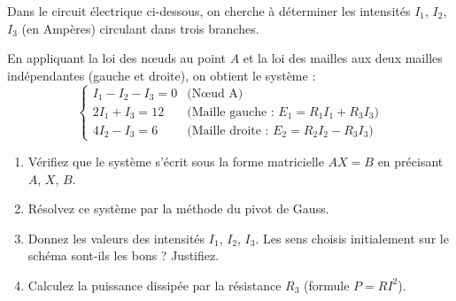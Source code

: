 \documentclass[11pt]{article}
\begin{document}
\begin{exercice}
\label{exo:electricite}
Dans le circuit électrique ci-dessous, on cherche à déterminer les intensités $I_1$, $I_2$, $I_3$ (en Ampères) circulant dans trois branches.
\begin{center}
\end{center}
En appliquant la loi des nœuds au point $A$ et la loi des mailles aux deux mailles indépendantes (gauche et droite), on obtient le système :
\[
\begin{cases}
I_1 - I_2 - I_3 = 0 & \text{(Nœud A)} \\
2I_1 + I_3 = 12 & \text{(Maille gauche : } E_1 = R_1 I_1 + R_3 I_3\text{)} \\
4I_2 - I_3 = 6 & \text{(Maille droite : } E_2 = R_2 I_2 - R_3 I_3\text{)}
\end{cases}
\]
\begin{enumerate}
\item Vérifiez que le système s'écrit sous la forme matricielle $A X = B$ en précisant $A$, $X$, $B$.
\item Résolvez ce système par la méthode du pivot de Gauss.
\item Donnez les valeurs des intensités $I_1$, $I_2$, $I_3$. Les sens choisis initialement sur le schéma sont-ils les bons ? Justifiez.
\item Calculez la puissance dissipée par la résistance $R_3$ (formule $P = R I^2$).
\end{enumerate}
\end{exercice}
\end{document}
